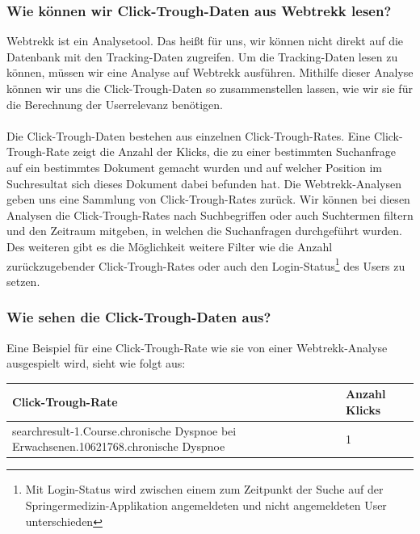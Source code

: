 \subsubsection{Wie können wir Click-Trough-Daten aus Webtrekk lesen?}
\label{sec:Einfuehrung:Methodik:Click-Trough-Daten:LesenClick-Trough-Daten}

Webtrekk ist ein Analysetool. Das heißt für uns, wir können nicht direkt auf die Datenbank mit den Tracking-Daten zugreifen. Um die Tracking-Daten lesen zu können, müssen wir eine Analyse auf Webtrekk ausführen. Mithilfe dieser Analyse können wir uns die Click-Trough-Daten so zusammenstellen lassen, wie wir sie für die Berechnung der Userrelevanz benötigen.
\\
\\
Die Click-Trough-Daten bestehen aus einzelnen Click-Trough-Rates. Eine Click-Trough-Rate zeigt die Anzahl der Klicks, die zu einer bestimmten Suchanfrage auf ein bestimmtes Dokument gemacht wurden und auf welcher Position im Suchresultat sich dieses Dokument dabei befunden hat. Die Webtrekk-Analysen geben uns eine Sammlung von Click-Trough-Rates zurück. Wir können bei diesen Analysen die Click-Trough-Rates nach Suchbegriffen oder auch Suchtermen filtern und den Zeitraum mitgeben, in welchen die Suchanfragen durchgeführt wurden. Des weiteren gibt es die Möglichkeit weitere Filter wie die Anzahl zurückzugebender Click-Trough-Rates oder auch den \glqq Login-Status\footnote{Mit Login-Status wird zwischen einem zum Zeitpunkt der Suche auf der Springermedizin-Applikation angemeldeten und nicht angemeldeten User unterschieden} des Users\grqq{} zu setzen. 

\subsubsection{Wie sehen die Click-Trough-Daten aus?}
\label{sec:Einfuehrung:Methodik:Click-Trough-Daten:AussehenClick-Trough-Daten}

Eine Beispiel für eine Click-Trough-Rate wie sie von einer Webtrekk-Analyse ausgespielt wird, sieht wie folgt aus:

\begin{tabular}{|p{}|p{}|}\hline
	\textbf{Click-Trough-Rate} & \textbf{Anzahl Klicks} \\ \hline
	searchresult-1.Course.chronische Dyspnoe bei Erwachsenen.10621768.chronische Dyspnoe & 1 \\ \hline
 \end{tabular}

